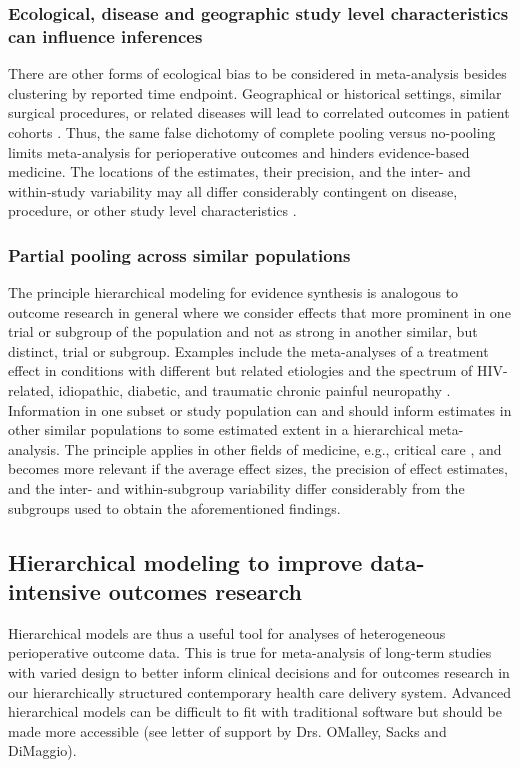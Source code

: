 \documentclass[11pt,notitlepage]{article}
\begin{document}
\subsubsection*{Ecological, disease and geographic study level characteristics can influence inferences}
There are other forms of ecological bias to be considered in meta-analysis besides clustering by reported time endpoint. Geographical or 
historical settings, similar surgical procedures, or related diseases will lead to correlated outcomes in patient cohorts 
\cite{Abroug2011,Andreae2013,Andreae2015,Roth2015CriticalCare}. 
Thus, the same false dichotomy of complete pooling versus no-pooling limits meta-analysis for perioperative outcomes and hinders evidence-based 
medicine. The locations of the estimates, their precision, and the inter- and within-study variability may all differ considerably 
contingent on disease, procedure, or other study level characteristics \cite{Andreae2013,Andreae2015,Roth2015CriticalCare}.

\subsubsection*{Partial pooling across similar populations}
The principle hierarchical modeling for evidence synthesis is analogous to outcome research in general where we 
consider effects that more prominent in one trial or subgroup of the population and not as strong in another similar, but 
distinct, trial or subgroup. Examples include the meta-analyses of a treatment effect in conditions with different but 
related etiologies and the spectrum of HIV-related, idiopathic, diabetic, and traumatic chronic painful neuropathy 
\cite{Andreae2015}. Information in one subset or study population can and should inform estimates in other similar populations 
to some estimated extent in a hierarchical meta-analysis. The principle applies in other fields of medicine, e.g., critical care
\cite{Roth2015CriticalCare}, and becomes more relevant if the average effect sizes, the precision of effect 
estimates, and the inter- and within-subgroup variability differ considerably from the subgroups used to obtain 
the aforementioned findings.

\subsection*{Hierarchical modeling to improve data-intensive outcomes research}
 
Hierarchical models are thus a useful tool for analyses of
heterogeneous perioperative outcome data. This is true for meta-analysis 
of long-term studies with varied design to better inform clinical 
decisions\cite{AndreaeJohnsonAbstract2013,Spiegelhalter2004bayesian} and 
for outcomes research in our hierarchically structured contemporary health care delivery system. 
Advanced hierarchical models can be difficult to fit with traditional software but should be 
made more accessible (see letter of support by Drs. OMalley, Sacks and DiMaggio).
\end{document}
